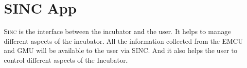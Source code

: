\documentclass[../../main]{subfiles}
\begin{document}
\section{SINC App} \label{sec:}

\textsc{Sinc} is the interface between the incubator and the user.
It helps to manage different aspects of the incubator. All the information
collected from the EMCU and GMU will be available to the user via SINC.
And it also helps the user to control different aspects of the Incubator.
\end{document}
